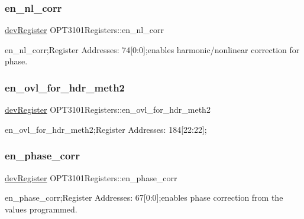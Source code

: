 \subsubsection{\texorpdfstring{en\+\_\+nl\+\_\+corr}{en\_nl\_corr}}
{\footnotesize\ttfamily \mbox{\hyperlink{classdev_register}{dev\+Register}} O\+P\+T3101\+Registers\+::en\+\_\+nl\+\_\+corr}



en\+\_\+nl\+\_\+corr;Register Addresses\+: 74\mbox{[}0\+:0\mbox{]};enables harmonic/nonlinear correction for phase. 

\mbox{\label{class_o_p_t3101_registers_a90eba53ebb9b8a8e9d324106905e4486}} 
\subsubsection{\texorpdfstring{en\+\_\+ovl\+\_\+for\+\_\+hdr\+\_\+meth2}{en\_ovl\_for\_hdr\_meth2}}
{\footnotesize\ttfamily \mbox{\hyperlink{classdev_register}{dev\+Register}} O\+P\+T3101\+Registers\+::en\+\_\+ovl\+\_\+for\+\_\+hdr\+\_\+meth2}



en\+\_\+ovl\+\_\+for\+\_\+hdr\+\_\+meth2;Register Addresses\+: 184\mbox{[}22\+:22\mbox{]}; 

\mbox{\label{class_o_p_t3101_registers_a708f5d3ac94ad4fa314d42ad42026a14}} 
\subsubsection{\texorpdfstring{en\+\_\+phase\+\_\+corr}{en\_phase\_corr}}
{\footnotesize\ttfamily \mbox{\hyperlink{classdev_register}{dev\+Register}} O\+P\+T3101\+Registers\+::en\+\_\+phase\+\_\+corr}



en\+\_\+phase\+\_\+corr;Register Addresses\+: 67\mbox{[}0\+:0\mbox{]};enables phase correction from the values programmed. 

